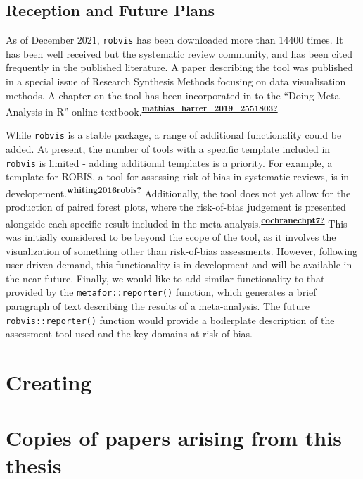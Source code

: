 \documentclass[a4paper, twoside]{templates/ociamthesis}
\newcommand*{\bibtitle}{Bibliography}
\begin{document}
\hypertarget{reception-and-future-plans-1}{%
\subsection{Reception and Future Plans}\label{reception-and-future-plans-1}}

As of December 2021, \texttt{robvis} has been downloaded more than 14400 times. It has been well received but the systematic review community, and has been cited frequently in the published literature. A paper describing the tool was published in a special issue of Research Synthesis Methods focusing on data visualisation methods. A chapter on the tool has been incorporated in to the ``Doing Meta-Analysis in R'' online textbook.\textsuperscript{\protect\hyperlink{ref-mathias_harrer_2019_2551803}{\textbf{mathias\_harrer\_2019\_2551803?}}}

While \texttt{robvis} is a stable package, a range of additional functionality could be added. At present, the number of tools with a specific template included in \texttt{robvis} is limited - adding additional templates is a priority. For example, a template for ROBIS, a tool for assessing risk of bias in systematic reviews, is in developement.\textsuperscript{\protect\hyperlink{ref-whiting2016robis}{\textbf{whiting2016robis?}}} Additionally, the tool does not yet allow for the production of paired forest plots, where the risk-of-bias judgement is presented alongside each specific result included in the meta-analysis.\textsuperscript{\protect\hyperlink{ref-cochranechpt7}{\textbf{cochranechpt7?}}} This was initially considered to be beyond the scope of the tool, as it involves the visualization of something other than risk-of-bias assessments. However, following user-driven demand, this functionality is in development and will be available in the near future. Finally, we would like to add similar functionality to that provided by the \texttt{metafor::reporter()} function, which generates a brief paragraph of text describing the results of a meta-analysis. The future \texttt{robvis::reporter()} function would provide a boilerplate description of the assessment tool used and the key domains at risk of bias.

\hypertarget{creating}{%
\section{Creating}\label{creating}}

\hypertarget{published-papers}{%
\section{Copies of papers arising from this thesis}\label{published-papers}}






\setlength{\baselineskip}{0pt} %

{\renewcommand*\MakeUppercase[1]{#1}%
\printbibliography[heading=bibintoc,title={\bibtitle}]}
\end{document}

